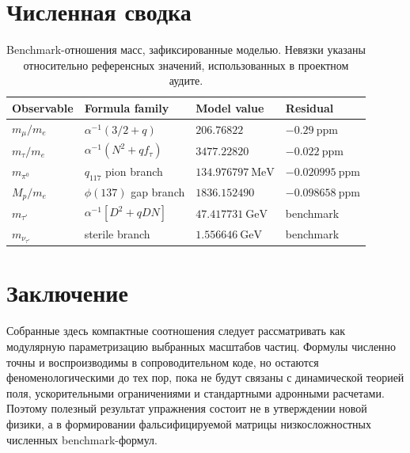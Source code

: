 \documentclass[11pt]{article}
\begin{document}
\section{Численная сводка}

\begin{table}[h]
\centering
\caption{Benchmark-отношения масс, зафиксированные моделью. Невязки указаны
относительно референсных значений, использованных в проектном аудите.}
\begin{tabular}{llll}
\toprule
Observable & Formula family & Model value & Residual \\
\midrule
$m_\mu/m_e$ & $\alpha^{-1}(3/2+q)$ & $206.76822$ & $-0.29~\mathrm{ppm}$ \\
$m_\tau/m_e$ & $\alpha^{-1}(N^2+qf_\tau)$ & $3477.22820$ & $-0.022~\mathrm{ppm}$ \\
$m_{\pi^0}$ & $q_{117}$ pion branch & $134.976797~\mathrm{MeV}$ & $-0.020995~\mathrm{ppm}$ \\
$M_p/m_e$ & $\phi(137)$ gap branch & $1836.152490$ & $-0.098658~\mathrm{ppm}$ \\
$m_{\tau'}$ & $\alpha^{-1}[D^2+qDN]$ & $47.417731~\mathrm{GeV}$ & benchmark \\
$m_{\nu_{\tau'}}$ & sterile branch & $1.556646~\mathrm{GeV}$ & benchmark \\
\bottomrule
\end{tabular}
\end{table}

\section{Заключение}

Собранные здесь компактные соотношения следует рассматривать как модулярную
параметризацию выбранных масштабов частиц. Формулы численно точны и
воспроизводимы в сопроводительном коде, но остаются феноменологическими до тех
пор, пока не будут связаны с динамической теорией поля, ускорительными
ограничениями и стандартными адронными расчетами. Поэтому полезный результат
упражнения состоит не в утверждении новой физики, а в формировании
фальсифицируемой матрицы низкосложностных численных benchmark-формул.
\end{document}
